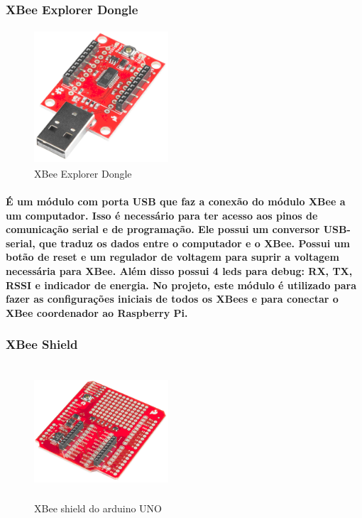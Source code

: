 \subsubsection{XBee Explorer Dongle}
\begin{figure}[H]
\begin{center}
\includegraphics[width=5cm,height=5cm,keepaspectratio]{figuras/xbee_explorer_dongle.png}
\caption{\label{fig:xbee explorer dongle} XBee Explorer Dongle}
\end{center}
\end{figure}
\paragraph{
É um módulo com porta USB que faz a conexão do módulo XBee a um computador. Isso é necessário para ter acesso aos pinos de comunicação serial e de programação. Ele possui um conversor USB-serial, que traduz os dados entre o computador e o XBee. Possui um botão de reset e um regulador de voltagem para suprir a voltagem necessária para XBee. Além disso possui 4 leds para debug: RX, TX, RSSI e indicador de energia. No projeto, este módulo é utilizado para fazer as configurações iniciais de todos os XBees e para conectar o XBee coordenador ao Raspberry Pi.
}

\subsubsection{XBee Shield}
\begin{figure}[H]
\begin{center}
\includegraphics[width=5cm,height=5cm,keepaspectratio]{figuras/xbee_shield.png}
\caption{\label{fig:xbee shield} XBee shield do arduino UNO}
\end{center}
\end{figure}
